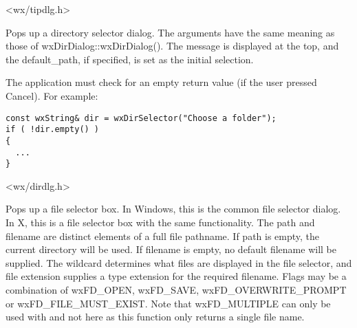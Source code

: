 


<wx/tipdlg.h>


\label{wxdirselector}


Pops up a directory selector dialog. The arguments have the same meaning as
those of wxDirDialog::wxDirDialog(). The message is displayed at the top,
and the default\_path, if specified, is set as the initial selection.

The application must check for an empty return value (if the user pressed
Cancel). For example:

\begin{verbatim}
const wxString& dir = wxDirSelector("Choose a folder");
if ( !dir.empty() )
{
  ...
}
\end{verbatim}


<wx/dirdlg.h>


\label{wxfileselector}


Pops up a file selector box. In Windows, this is the common file selector
dialog. In X, this is a file selector box with the same functionality.
The path and filename are distinct elements of a full file pathname.
If path is empty, the current directory will be used. If filename is empty,
no default filename will be supplied. The wildcard determines what files
are displayed in the file selector, and file extension supplies a type
extension for the required filename. Flags may be a combination of wxFD\_OPEN,
wxFD\_SAVE, wxFD\_OVERWRITE\_PROMPT or wxFD\_FILE\_MUST\_EXIST. Note that wxFD\_MULTIPLE
can only be used with  and not here as this
function only returns a single file name.


